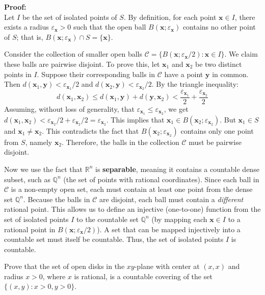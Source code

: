 \textbf{Proof:}\\
Let $I$ be the set of isolated points of $S$. By definition, for each point $\mathbf{x} \in I$, there exists a radius $\varepsilon_{\mathbf{x}} > 0$ such that the open ball $B(\mathbf{x}; \varepsilon_{\mathbf{x}})$ contains no other point of $S$; that is, $B(\mathbf{x}; \varepsilon_{\mathbf{x}}) \cap S = \{\mathbf{x}\}$.

Consider the collection of smaller open balls $\mathcal{C} = \{ B(\mathbf{x}; \varepsilon_{\mathbf{x}}/2) : \mathbf{x} \in I \}$. We claim these balls are pairwise disjoint.
To prove this, let $\mathbf{x}_1$ and $\mathbf{x}_2$ be two distinct points in $I$. Suppose their corresponding balls in $\mathcal{C}$ have a point $\mathbf{y}$ in common. Then $d(\mathbf{x}_1, \mathbf{y}) < \varepsilon_{\mathbf{x}_1}/2$ and $d(\mathbf{x}_2, \mathbf{y}) < \varepsilon_{\mathbf{x}_2}/2$.
By the triangle inequality:
$$d(\mathbf{x}_1, \mathbf{x}_2) \le d(\mathbf{x}_1, \mathbf{y}) + d(\mathbf{y}, \mathbf{x}_2) < \frac{\varepsilon_{\mathbf{x}_1}}{2} + \frac{\varepsilon_{\mathbf{x}_2}}{2}$$
Assuming, without loss of generality, that $\varepsilon_{\mathbf{x}_1} \le \varepsilon_{\mathbf{x}_2}$, we get $d(\mathbf{x}_1, \mathbf{x}_2) < \varepsilon_{\mathbf{x}_2}/2 + \varepsilon_{\mathbf{x}_2}/2 = \varepsilon_{\mathbf{x}_2}$.
This implies that $\mathbf{x}_1 \in B(\mathbf{x}_2; \varepsilon_{\mathbf{x}_2})$. But $\mathbf{x}_1 \in S$ and $\mathbf{x}_1 \neq \mathbf{x}_2$. This contradicts the fact that $B(\mathbf{x}_2; \varepsilon_{\mathbf{x}_2})$ contains only one point from $S$, namely $\mathbf{x}_2$.
Therefore, the balls in the collection $\mathcal{C}$ must be pairwise disjoint.

Now we use the fact that $\mathbb{R}^n$ is \textbf{separable}, meaning it contains a countable dense subset, such as $\mathbb{Q}^n$ (the set of points with rational coordinates).
Since each ball in $\mathcal{C}$ is a non-empty open set, each must contain at least one point from the dense set $\mathbb{Q}^n$. Because the balls in $\mathcal{C}$ are disjoint, each ball must contain a \textit{different} rational point.
This allows us to define an injective (one-to-one) function from the set of isolated points $I$ to the countable set $\mathbb{Q}^n$ (by mapping each $\mathbf{x} \in I$ to a rational point in $B(\mathbf{x}; \varepsilon_{\mathbf{x}}/2)$). A set that can be mapped injectively into a countable set must itself be countable.
Thus, the set of isolated points $I$ is countable.

\begin{problembox}
Prove that the set of open disks in the \(xy\)-plane with center at \( (x, x) \) and radius \( x > 0 \), where \( x \) is rational, is a countable covering of the set \( \{(x, y) : x > 0, y > 0\} \).
\end{problembox}

